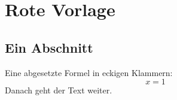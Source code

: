 \chapter{Rote Vorlage}\label{c98}

\section{Ein Abschnitt}\label{c98.s1}

Eine abgesetzte Formel in eckigen Klammern:
\[ x = 1 \]
Danach geht der Text weiter.

